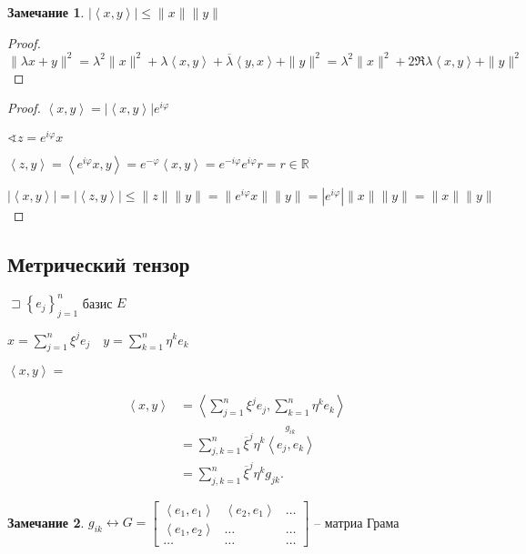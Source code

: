 \documentclass{book}
\newcommand\R{\ensuremath{\mathbb{R}}}
\newcommand{\ov}[1]{\overline{#1}}
\theoremstyle{definition}
\newtheorem*{note}{Замечание}
\begin{document}
\begin{note}
    $|\left<x, y \right>| \leqslant \|x\|\|y\| $
\end{note}
\begin{proof}
    $\|\lambda x + y\|^2 = \lambda^2\|x\|^2 + \lambda \left<x, y \right> + \ov{\lambda }\left<y, x \right> + \|y\|^2 = \lambda^2\|x\|^2 + 2\Re \lambda \left<x, y \right> + \|y\|^2$
\end{proof}

\begin{lemma}
\end{lemma}
\begin{proof}
    $\left<x, y \right> = |\left<x, y \right>|e^{i\varphi}$

    $\sphericalangle z = e^{i\varphi}x$

    $\left<z, y \right> =  \left<e^{i\varphi}x, y \right> = e^{-\varphi}\left<x, y \right> = e^{-i\varphi}e^{i\varphi}r = r \in \R$

    $|\left<x, y \right>| = |\left<z, y \right>| \leqslant \|z\|\|y\| = \|e^{i\varphi}x\|\|y\| = |e^{i\varphi}| \|x\|\|y\| = \|x\|\|y\|$
\end{proof}

\subsection{Метрический тензор}

$\sqsupset \left\{ e_j \right\} _{j=1}^n$ базис $E$

 $x = \sum_{j=1}^{n} \xi^je_j\quad y = \sum_{k=1}^{n} \eta^ke_k$ 

 $\left<x, y \right> = $

 \begin{align*}
     \left<x, y \right> &= \left<\sum_{j=1}^{n} \xi^je_j, \sum_{k=1}^{n} \eta^k e_k \right>\\& = \sum_{j,k=1}^{n} \ov{\xi}^j\eta^k \overset{g_{ik}}{\left<e_j, e_k \right>}\\& = \sum_{j,k=1}^{n} \ov{\xi}^j\eta^kg_{jk}
 .\end{align*}

 \begin{note}
     $g_{ik} \longleftrightarrow G = \begin{bmatrix} \left<e_1, e_1 \right> & \left<e_2, e_1 \right> & \ldots\\ \left<e_1, e_2 \right>& \ldots& \ldots\\\ldots & \ldots & \ldots \end{bmatrix} $ -- матриа Грама
 \end{note}
\end{document}
